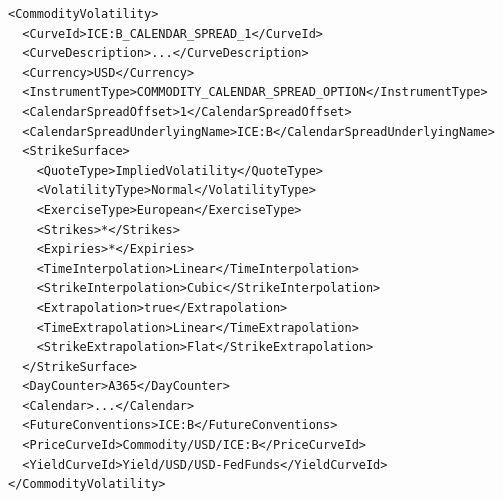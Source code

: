 \begin{longlisting}
\begin{verbatim}
<CommodityVolatility>
  <CurveId>ICE:B_CALENDAR_SPREAD_1</CurveId>
  <CurveDescription>...</CurveDescription>
  <Currency>USD</Currency>
  <InstrumentType>COMMODITY_CALENDAR_SPREAD_OPTION</InstrumentType>
  <CalendarSpreadOffset>1</CalendarSpreadOffset>
  <CalendarSpreadUnderlyingName>ICE:B</CalendarSpreadUnderlyingName>
  <StrikeSurface>
    <QuoteType>ImpliedVolatility</QuoteType>
    <VolatilityType>Normal</VolatilityType>
    <ExerciseType>European</ExerciseType>
    <Strikes>*</Strikes>
    <Expiries>*</Expiries>
    <TimeInterpolation>Linear</TimeInterpolation>
    <StrikeInterpolation>Cubic</StrikeInterpolation>
    <Extrapolation>true</Extrapolation>
    <TimeExtrapolation>Linear</TimeExtrapolation>
    <StrikeExtrapolation>Flat</StrikeExtrapolation>
  </StrikeSurface>
  <DayCounter>A365</DayCounter>
  <Calendar>...</Calendar>
  <FutureConventions>ICE:B</FutureConventions>
  <PriceCurveId>Commodity/USD/ICE:B</PriceCurveId>
  <YieldCurveId>Yield/USD/USD-FedFunds</YieldCurveId>
</CommodityVolatility>
\end{verbatim}
\caption{Calendar spread option volatility configuration}
\label{lst:comm_vol_calspread_config}
\end{longlisting}

